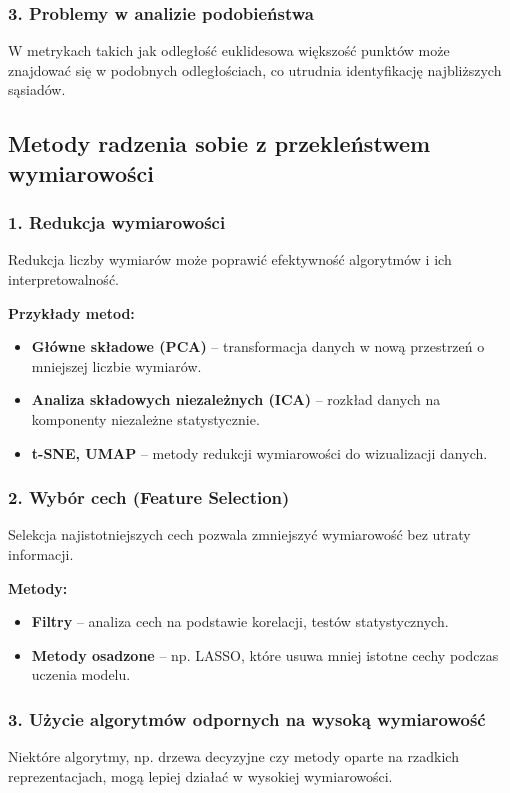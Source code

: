 \subsubsection{3. Problemy w analizie podobieństwa}
W metrykach takich jak odległość euklidesowa większość punktów może znajdować się w podobnych odległościach, co utrudnia identyfikację najbliższych sąsiadów.

\subsection{Metody radzenia sobie z przekleństwem wymiarowości}

\subsubsection{1. Redukcja wymiarowości}
Redukcja liczby wymiarów może poprawić efektywność algorytmów i ich interpretowalność.

\textbf{Przykłady metod:}
\begin{itemize}
    \item \textbf{Główne składowe (PCA)} – transformacja danych w nową przestrzeń o mniejszej liczbie wymiarów.
    \item \textbf{Analiza składowych niezależnych (ICA)} – rozkład danych na komponenty niezależne statystycznie.
    \item \textbf{t-SNE, UMAP} – metody redukcji wymiarowości do wizualizacji danych.
\end{itemize}

\subsubsection{2. Wybór cech (Feature Selection)}
Selekcja najistotniejszych cech pozwala zmniejszyć wymiarowość bez utraty informacji.

\textbf{Metody:}
\begin{itemize}
    \item \textbf{Filtry} – analiza cech na podstawie korelacji, testów statystycznych.
    \item \textbf{Metody osadzone} – np. LASSO, które usuwa mniej istotne cechy podczas uczenia modelu.
\end{itemize}

\subsubsection{3. Użycie algorytmów odpornych na wysoką wymiarowość}
Niektóre algorytmy, np. drzewa decyzyjne czy metody oparte na rzadkich reprezentacjach, mogą lepiej działać w wysokiej wymiarowości.

